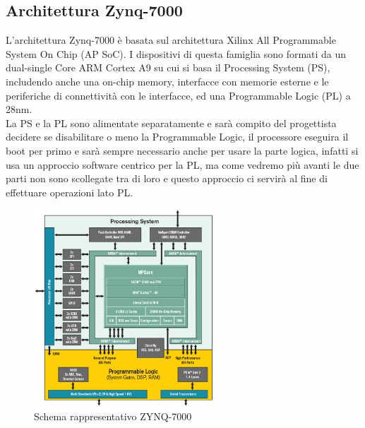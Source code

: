 \subsection{Architettura Zynq-7000}
L'architettura Zynq-7000 è basata sul architettura Xilinx All Programmable System On Chip (AP SoC). I dispositivi di questa famiglia sono formati da un dual-single Core ARM Cortex A9 su cui si basa il Processing System (PS), includendo anche una on-chip memory, interfacce con memorie esterne e le periferiche di connettività con le interfacce, ed una Programmable Logic (PL) a 28nm.\\
La PS e la PL sono alimentate separatamente e sarà compito del progettista decidere se disabilitare o meno la Programmable Logic, il processore eseguira il boot per primo e sarà sempre necessario anche per usare la parte logica, infatti si usa un approccio software centrico per la PL, ma come vedremo più avanti le due parti non sono scollegate tra di loro e questo approccio ci servirà al fine di effettuare operazioni lato PL.
\begin{figure}[h]
\centering
\includegraphics[width=0.6\textwidth]{images/zynq_arch.png}
\caption{Schema rappresentativo ZYNQ-7000\cite{Zynq-7000}}
\end{figure}\\
